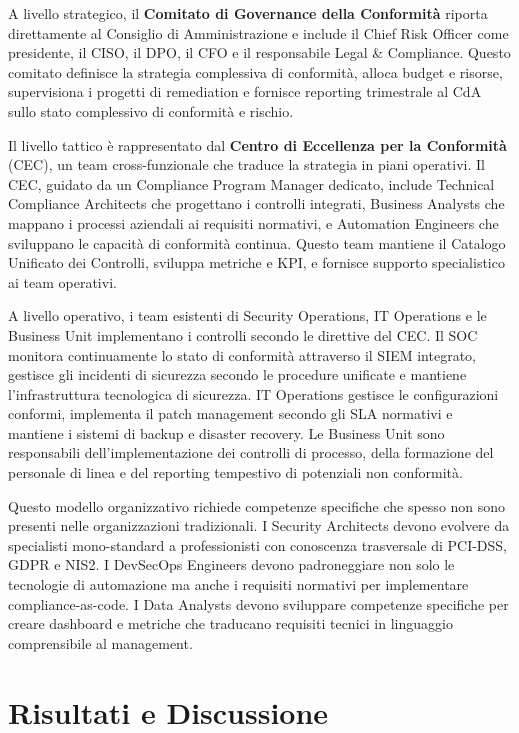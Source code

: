 A livello strategico, il \textbf{Comitato di Governance della Conformità} riporta direttamente al Consiglio di Amministrazione e include il Chief Risk Officer come presidente, il CISO, il DPO, il CFO e il responsabile Legal \& Compliance. Questo comitato definisce la strategia complessiva di conformità, alloca budget e risorse, supervisiona i progetti di remediation e fornisce reporting trimestrale al CdA sullo stato complessivo di conformità e rischio.

Il livello tattico è rappresentato dal \textbf{Centro di Eccellenza per la Conformità} (CEC), un team cross-funzionale che traduce la strategia in piani operativi. Il CEC, guidato da un Compliance Program Manager dedicato, include Technical Compliance Architects che progettano i controlli integrati, Business Analysts che mappano i processi aziendali ai requisiti normativi, e Automation Engineers che sviluppano le capacità di conformità continua. Questo team mantiene il Catalogo Unificato dei Controlli, sviluppa metriche e KPI, e fornisce supporto specialistico ai team operativi.

A livello operativo, i team esistenti di Security Operations, IT Operations e le Business Unit implementano i controlli secondo le direttive del CEC. Il SOC monitora continuamente lo stato di conformità attraverso il SIEM integrato, gestisce gli incidenti di sicurezza secondo le procedure unificate e mantiene l'infrastruttura tecnologica di sicurezza. IT Operations gestisce le configurazioni conformi, implementa il patch management secondo gli SLA normativi e mantiene i sistemi di backup e disaster recovery. Le Business Unit sono responsabili dell'implementazione dei controlli di processo, della formazione del personale di linea e del reporting tempestivo di potenziali non conformità.

Questo modello organizzativo richiede competenze specifiche che spesso non sono presenti nelle organizzazioni tradizionali. I Security Architects devono evolvere da specialisti mono-standard a professionisti con conoscenza trasversale di PCI-DSS, GDPR e NIS2. I DevSecOps Engineers devono padroneggiare non solo le tecnologie di automazione ma anche i requisiti normativi per implementare compliance-as-code. I Data Analysts devono sviluppare competenze specifiche per creare dashboard e metriche che traducano requisiti tecnici in linguaggio comprensibile al management.

\section{Risultati e Discussione}
\label{sec:4.6_risultati}

